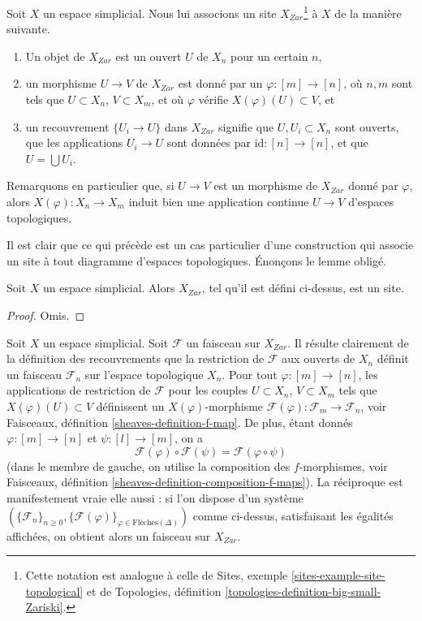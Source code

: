 \medskip\noindent
Soit $X$ un espace simplicial. Nous lui associons un site
$X_{Zar}$\footnote{Cette notation est analogue à celle de
Sites, exemple \ref{sites-example-site-topological}
et de
Topologies, définition \ref{topologies-definition-big-small-Zariski}.}
à $X$ de la manière suivante.
\begin{enumerate}
\item Un objet de $X_{Zar}$ est un ouvert $U$ de $X_n$ pour un certain $n$,
\item un morphisme $U \to V$ de $X_{Zar}$ est donné par un
$\varphi : [m] \to [n]$, où $n, m$ sont tels que
$U \subset X_n$, $V \subset X_m$, et où $\varphi$ vérifie
$X(\varphi)(U) \subset V$, et
\item un recouvrement $\{U_i \to U\}$ dans $X_{Zar}$ signifie
que $U, U_i \subset X_n$ sont ouverts, que les applications $U_i \to U$ sont
données par $\text{id} : [n] \to [n]$, et que $U = \bigcup U_i$.
\end{enumerate}
Remarquons en particulier que, si $U \to V$ est un morphisme de $X_{Zar}$
donné par $\varphi$, alors $X(\varphi) : X_n \to X_m$ induit bien
une application continue $U \to V$ d'espaces topologiques.

\noindent
Il est clair que ce qui précède est un cas particulier d'une construction
qui associe un site à tout diagramme d'espaces topologiques. Énonçons
le lemme obligé.

\begin{lemma}
\label{lemma-simplicial-site}
Soit $X$ un espace simplicial. Alors $X_{Zar}$, tel qu'il est
défini ci-dessus, est un site.
\end{lemma}

\begin{proof}
Omis.
\end{proof}

\noindent
Soit $X$ un espace simplicial. Soit $\mathcal{F}$ un faisceau sur $X_{Zar}$.
Il résulte clairement de la définition des recouvrements que la restriction
de $\mathcal{F}$ aux ouverts de $X_n$ définit un faisceau $\mathcal{F}_n$
sur l'espace topologique $X_n$. Pour tout $\varphi : [m] \to [n]$, les
applications de restriction de $\mathcal{F}$ pour les couples $U \subset X_n$, $V \subset X_m$
tels que $X(\varphi)(U) \subset V$ définissent un $X(\varphi)$-morphisme
$\mathcal{F}(\varphi) : \mathcal{F}_m \to \mathcal{F}_n$, voir
Faisceaux, définition \ref{sheaves-definition-f-map}.
De plus, étant donnés $\varphi : [m] \to [n]$ et $\psi : [l] \to [m]$,
on a
$$
\mathcal{F}(\varphi) \circ \mathcal{F}(\psi) =
\mathcal{F}(\varphi \circ \psi)
$$
(dans le membre de gauche, on utilise la composition des $f$-morphismes, voir
Faisceaux, définition \ref{sheaves-definition-composition-f-maps}).
La réciproque est manifestement vraie elle aussi : si l'on dispose d'un système
$(\{\mathcal{F}_n\}_{n \geq 0},
\{\mathcal{F}(\varphi)\}_{\varphi \in \text{Flèches}(\Delta)})$
comme ci-dessus, satisfaisant les égalités affichées,
on obtient alors un faisceau sur $X_{Zar}$.

